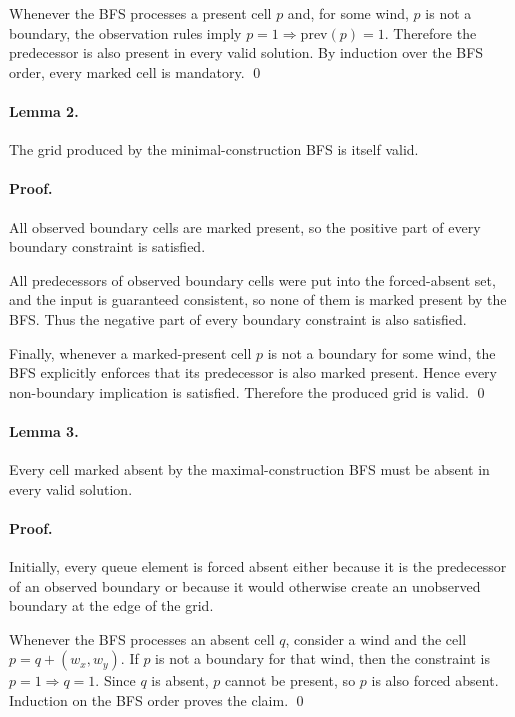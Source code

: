 \documentclass[11pt]{article}
\begin{document}
Whenever the BFS processes a present cell $p$ and, for some wind, $p$ is not a boundary, the observation
rules imply $p = 1 \Rightarrow \mathrm{prev}(p) = 1$. Therefore the predecessor is also present in every
valid solution. By induction over the BFS order, every marked cell is mandatory. \qed

\paragraph{Lemma 2.}
The grid produced by the minimal-construction BFS is itself valid.

\paragraph{Proof.}
All observed boundary cells are marked present, so the positive part of every boundary constraint is
satisfied.

All predecessors of observed boundary cells were put into the forced-absent set, and the input is
guaranteed consistent, so none of them is marked present by the BFS. Thus the negative part of every
boundary constraint is also satisfied.

Finally, whenever a marked-present cell $p$ is not a boundary for some wind, the BFS explicitly enforces
that its predecessor is also marked present. Hence every non-boundary implication is satisfied. Therefore
the produced grid is valid. \qed

\paragraph{Lemma 3.}
Every cell marked absent by the maximal-construction BFS must be absent in every valid solution.

\paragraph{Proof.}
Initially, every queue element is forced absent either because it is the predecessor of an observed
boundary or because it would otherwise create an unobserved boundary at the edge of the grid.

Whenever the BFS processes an absent cell $q$, consider a wind and the cell $p=q+(w_x,w_y)$. If $p$ is
not a boundary for that wind, then the constraint is $p = 1 \Rightarrow q = 1$. Since $q$ is absent, $p$
cannot be present, so $p$ is also forced absent. Induction on the BFS order proves the claim. \qed
\end{document}
